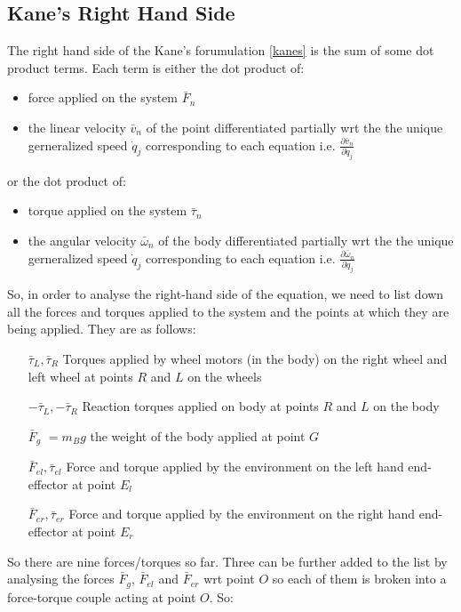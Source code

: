 \documentclass[a4paper,10pt]{article}
\begin{document}
\subsection{Kane's Right Hand Side}

The right hand side of the Kane's forumulation \ref{kanes} is the sum of some dot product terms. Each term is either the
dot product of:
\begin{itemize}
 \item force applied on the system $\bar{F}_n$
 \item the linear velocity $\bar{v}_n$ of the point differentiated partially wrt the the unique gerneralized speed 
 $\dot{q}_j$ corresponding to each equation i.e. $\frac{\partial \bar{v}_n}{\partial \dot{q}_j}$\\
\end{itemize}
or the dot product of:
\begin{itemize}
 \item torque applied on the system $\bar{\tau}_n$
 \item the angular velocity $\bar{\omega}_n$ of the body differentiated partially wrt the the unique gerneralized speed 
 $\dot{q}_j$ corresponding to each equation i.e. $\frac{\partial \bar{\omega}_n}{\partial \dot{q}_j}$
\end{itemize}

So, in order to analyse the right-hand side of the equation, we need to list down all the forces and torques applied
to the system and the points at which they are being applied. They are as follows:
\begin{itemize}[label={}]
 \item[$\bar\tau_L, \bar\tau_R $] Torques applied by wheel motors (in the body) on the right wheel and left wheel at points 
 $R$ and $L$ on the wheels
 \item[$-\bar\tau_L, -\bar\tau_R $] Reaction torques applied on body at points $R$ and $L$ on the body
 \item[$\bar{F}_g$] $=m_Bg$ the weight of the body applied at point $G$
 \item[$\bar{F}_{el}, \bar{\tau}_{el}$] Force and torque applied by the environment on the left hand end-effector at point $E_l$
 \item[$\bar{F}_{er}, \bar{\tau}_{er}$] Force and torque applied by the environment on the right hand end-effector at point $E_r$
\end{itemize}

So there are nine forces/torques so far. Three can be further added to the list by analysing the forces $\bar{F}_g$, $\bar{F}_{el}$ and $\bar{F}_{er}$
wrt point $O$ so each of them is broken into a force-torque couple acting at point $O$. So:
\end{document}
